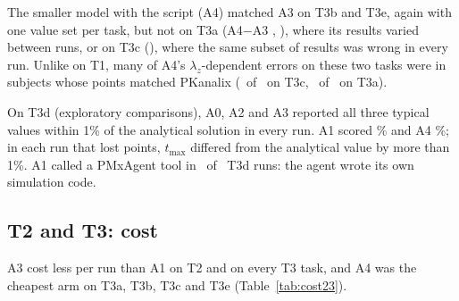 \documentclass[11pt]{article}
\begin{document}
The smaller model with the script (A4) matched A3 on T3b and T3e, again with one value set per task, but not on T3a
(A4$-$A3 \numTthreeaAfourVsAthreeDiff, \numTthreeaAfourVsAthreeCI), where its results varied between runs, or on T3c
(\numTthreecAfourVsAthreeDiff), where the same subset of results was wrong in every run. Unlike on T1, many of A4's
$\lambda_z$-dependent errors on these two tasks were in subjects whose points matched PKanalix
(\numTthreecAfourLzErrMatch\ of \numTthreecAfourLzErr\ on T3c, \numTthreeaAfourLzErrMatch\ of \numTthreeaAfourLzErr\ on
T3a).

On T3d (exploratory comparisons), A0, A2 and A3 reported all three typical values within 1\% of the analytical solution
in every run. A1 scored \numTthreedAoneAcc\% and A4 \numTthreedAfourAcc\%; in each run that lost points,
$t_\mathrm{max}$ differed from the analytical value by more than 1\%. A1 called a PMxAgent tool in
\numTthreedAonePmxRuns\ of \numTthreedAonePmxKnown\ T3d runs: the agent wrote its own simulation code.

\begin{table}[t]
\centering\small
\caption{T3 accuracy per arm (mean over 5 runs). NCA tasks (T3a, T3b, T3c, T3e): the T1 metric. T3d: percentage of
the three typical values within 1\% of the analytical solution. Sets: distinct sets of parameter values across runs.}
\label{tab:t3acc}
\resizebox{\linewidth}{!}{}
\end{table}

\begin{table}[t]
\centering\small
\caption{T3 comparisons of mean accuracy (percentage points; 5 vs 5 runs; 95\% percentile bootstrap CI).
$^\ddagger$Exploratory (T3d is not an NCA task); the NCA-task comparisons were pre-specified.}
\label{tab:t3stats}

\end{table}

\subsection{T2 and T3: cost}
A3 cost less per run than A1 on T2 and on every T3 task, and A4 was the cheapest arm on T3a, T3b, T3c and T3e
(Table~\ref{tab:cost23}).

\begin{table}[t]
\centering\small
\caption{T2 and T3 mean list-price cost per run (USD).}
\label{tab:cost23}

\end{table}
\end{document}
